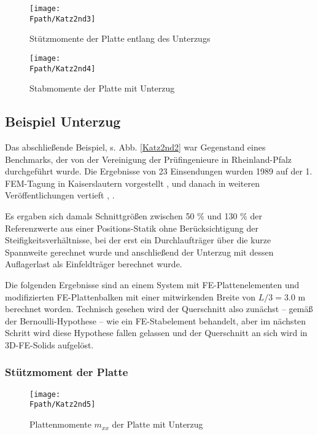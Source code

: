 \begin{figure}[tbp] \centering
\centering
\if {} \sidecaption[t] \fi
\texttt{[image: \\Fpath/Katz2nd3]}
\caption{St\"{u}tzmomente der Platte entlang des Unterzugs} \label{Katz2nd3}
\end{figure}%
\begin{figure}[tbp] \centering
\centering
\if {} \sidecaption[t] \fi
\texttt{[image: \\Fpath/Katz2nd4]}
\caption{Stabmomente der Platte mit Unterzug} \label{Katz2nd4}
\end{figure}%
\vspace{-0.3cm}
{\textcolor{sectionTitleBlue}{\subsection{Beispiel Unterzug}}}
Das abschlie{\ss}ende Beispiel, s. Abb. \ref{Katz2nd2} war Gegenstand eines Benchmarks, der von der Vereinigung der Pr\"{u}fingenieure in Rheinland-Pfalz durchgef\"{u}hrt wurde. Die Ergebnisse von 23 Einsendungen wurden 1989 auf der 1. FEM-Tagung in Kaiserslautern vorgestellt \cite{Zimmermann}, und danach in weiteren Ver\"{o}ffentlichungen vertieft \cite{Katz1}, \cite{Wu1}.

Es ergaben sich damals Schnittgr\"{o}{\ss}en zwischen 50 \% und 130 \%  der Referenzwerte aus einer Positions-Statik ohne Ber\"{u}cksichtigung der Steifigkeitsverh\"{a}ltnisse, bei der erst ein Durchlauftr\"{a}ger \"{u}ber die kurze Spannweite gerechnet wurde und anschlie{\ss}end der Unterzug mit dessen Auflagerlast als Einfeldtr\"{a}ger berechnet wurde.

Die folgenden Ergebnisse sind an einem System mit FE-Plattenelementen und modifizierten FE-Plattenbalken \cite{Katz1} mit einer mitwirkenden Breite von $L/3 = 3.0$ m berechnet worden. Technisch gesehen wird der Querschnitt also zun\"{a}chst -- gem\"{a}{\ss} der Bernoulli-Hypothese -- wie ein  FE-Stabelement behandelt, aber im n\"{a}chsten Schritt wird diese Hypothese fallen gelassen und der Querschnitt an sich wird in 3D-FE-Solids aufgel\"{o}st.

{\textcolor{sectionTitleBlue}{\subsubsection*{St\"{u}tzmoment der Platte}}}
\begin{figure}[tbp] \centering
\centering
\if {} \sidecaption[t] \fi
\texttt{[image: \\Fpath/Katz2nd5]}
\caption{Plattenmomente $m_{xx}$ der Platte mit Unterzug} \label{Katz2nd5}
\end{figure}%

